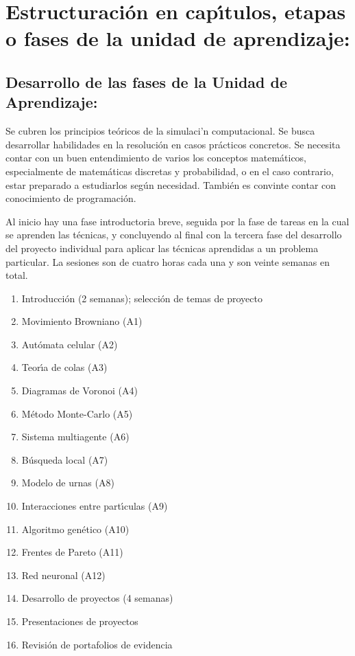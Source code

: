 \documentclass[10 pt]{article}
\begin{document}
\newpage
\section{Estructuraci\'{o}n en cap\'{\i}tulos, etapas o fases de la unidad de
  aprendizaje:}
\subsection{Desarrollo de las fases de la Unidad de Aprendizaje:}

Se cubren los principios te\'{o}ricos de la simulaci'n
computacional. Se busca desarrollar habilidades en la resoluci\'{o}n
en casos pr\'{a}cticos concretos. Se necesita contar con un buen
entendimiento de varios los conceptos matem\'{a}ticos, especialmente
de matem\'{a}ticas discretas y probabilidad, o en el caso contrario,
estar preparado a estudiarlos seg\'{u}n necesidad. Tambi\'{e}n es
convinte contar con conocimiento de programaci\'{o}n.

Al inicio hay una fase introductoria breve, seguida por la fase de
tareas en la cual se aprenden las t\'{e}cnicas, y concluyendo al final con
la tercera fase del desarrollo del proyecto individual para aplicar
las t\'{e}cnicas aprendidas a un problema particular. La sesiones son de cuatro horas cada una y son veinte
semanas en total.
\begin{enumerate}[itemsep=-3pt]
\item{Introducci\'{o}n (2 semanas); selecci\'{o}n de temas de proyecto}
\item{Movimiento Browniano (A1)}
\item{Aut\'{o}mata celular (A2)}
\item{Teor\'{\i}a de colas (A3)}
\item{Diagramas de Voronoi (A4)}
\item{M\'{e}todo Monte-Carlo (A5)}
\item{Sistema multiagente (A6)}
\item{B\'{u}squeda local (A7)}
\item{Modelo de urnas (A8)}
\item{Interacciones entre part\'{\i}culas (A9)}
\item{Algoritmo gen\'{e}tico (A10)}
\item{Frentes de Pareto (A11)}
\item{Red neuronal (A12)}
\item{Desarrollo de proyectos (4 semanas)}  
\item{Presentaciones de proyectos}
\item{Revisi\'{o}n de portafolios de evidencia}
\end{enumerate}
\end{document}
